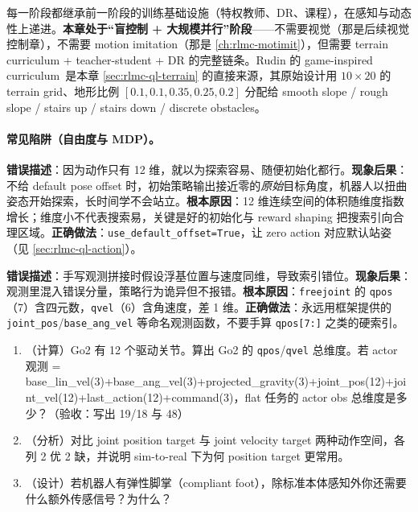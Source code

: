 每一阶段都继承前一阶段的训练基础设施（特权教师、DR、课程），在感知与动态性上递进。\textbf{本章处于“盲控制 + 大规模并行”阶段}——不需要视觉（那是后续视觉控制章），不需要 motion imitation（那是 \cref{ch:rlmc-motimit}），但需要 terrain curriculum + teacher-student + DR 的完整链条。Rudin 的 game-inspired curriculum\,\cite{rudin2021minutes} 是本章 \cref{sec:rlmc-ql-terrain} 的直接来源，其原始设计用 $10\times 20$ 的 terrain grid、地形比例 $[0.1, 0.1, 0.35, 0.25, 0.2]$ 分配给 smooth slope / rough slope / stairs up / stairs down / discrete obstacles。

\paragraph{常见陷阱（自由度与 MDP）。}

\begin{pitfall}[把 12 维动作空间当成“很小、好搜”]
\textbf{错误描述}：因为动作只有 12 维，就以为探索容易、随便初始化都行。\textbf{现象后果}：不给 default pose offset 时，初始策略输出接近零的\emph{原始}目标角度，机器人以扭曲姿态开始探索，长时间学不会站立。\textbf{根本原因}：12 维连续空间的体积随维度指数增长；维度小不代表搜索易，关键是好的初始化与 reward shaping 把搜索引向合理区域。\textbf{正确做法}：\verb|use_default_offset=True|，让 zero action 对应默认站姿（见 \cref{sec:rlmc-ql-action}）。
\end{pitfall}

\begin{pitfall}
\textbf{错误描述}：手写观测拼接时假设浮基位置与速度同维，导致索引错位。\textbf{现象后果}：观测里混入错误分量，策略行为诡异但不报错。\textbf{根本原因}：\verb|freejoint| 的 \verb|qpos|（7）含四元数，\verb|qvel|（6）含角速度，差 1 维。\textbf{正确做法}：永远用框架提供的 \verb|joint_pos|/\verb|base_ang_vel| 等命名观测函数，不要手算 \verb|qpos[7:]| 之类的硬索引。
\end{pitfall}

\begin{practice}
\begin{enumerate}
\item （计算）Go2 有 12 个驱动关节。算出 Go2 的 \verb|qpos|/\verb|qvel| 总维度。若 actor 观测 = base\_lin\_vel(3)+base\_ang\_vel(3)+projected\_gravity(3)+joint\_pos(12)+joint\_vel(12)+last\_action(12)+command(3)，flat 任务的 actor obs 总维度是多少？（验收：写出 19/18 与 48）
\item （分析）对比 joint position target 与 joint velocity target 两种动作空间，各列 2 优 2 缺，并说明 sim-to-real 下为何 position target 更常用。
\item （设计）若机器人有弹性脚掌（compliant foot），除标准本体感知外你还需要什么额外传感信号？为什么？
\end{enumerate}
\end{practice}

